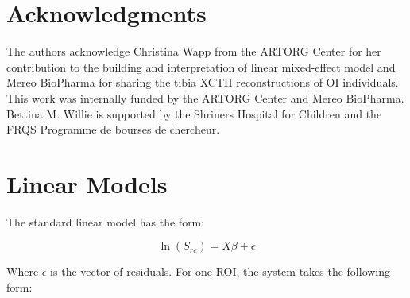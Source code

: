 \documentclass[a4paper,fleqn]{DC_ArtStyle}
\begin{document}
	
	\section*{Acknowledgments}
	The authors acknowledge Christina Wapp from the ARTORG Center for her contribution to the building and interpretation of linear mixed-effect model and Mereo BioPharma for sharing the tibia XCTII reconstructions of OI individuals. This work was internally funded by the ARTORG Center and Mereo BioPharma.  Bettina M. Willie is supported by the Shriners Hospital for Children and the FRQS Programme de bourses de chercheur. 
	
	\appendix
	\section{Linear Models}\label{A1}
	
	The standard linear model has the form:
	
	\begin{equation}
	\ln(S_{rc}) = X \beta + \epsilon
	\end{equation}
	
	Where $\epsilon$ is the vector of residuals. For one ROI, the system takes the following form:
	
\end{document}
